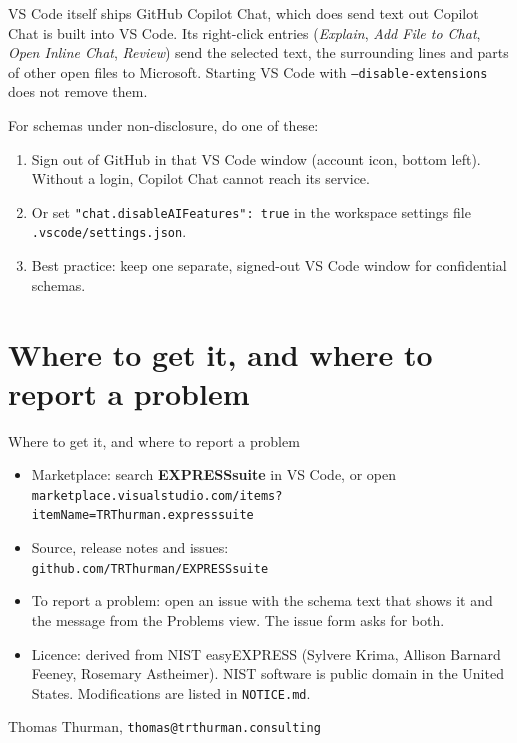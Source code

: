\documentclass[11pt]{beamer}
\newcommand{\code}[1]{\texttt{#1}}
\begin{document}
\begin{frame}{VS Code itself ships GitHub Copilot Chat, which does send text out}
  Copilot Chat is built into VS Code. Its right-click entries (\emph{Explain},
  \emph{Add File to Chat}, \emph{Open Inline Chat}, \emph{Review}) send the selected
  text, the surrounding lines and parts of other open files to Microsoft.
  Starting VS Code with \code{--disable-extensions} does not remove them.
  \medskip

  For schemas under non-disclosure, do one of these:
  \begin{enumerate}
    \item Sign out of GitHub in that VS Code window (account icon, bottom left).
      Without a login, Copilot Chat cannot reach its service.
    \item Or set \code{"chat.disableAIFeatures": true} in the workspace settings file
      \code{.vscode/settings.json}.
    \item Best practice: keep one separate, signed-out VS Code window for confidential schemas.
  \end{enumerate}
\end{frame}

\section{Where to get it, and where to report a problem}

\begin{frame}{Where to get it, and where to report a problem}
  \begin{itemize}
    \item Marketplace: search \textbf{EXPRESSsuite} in VS Code, or open\\
      \code{marketplace.visualstudio.com/items?}\\
      \code{itemName=TRThurman.expresssuite}
    \item Source, release notes and issues:\\
      \code{github.com/TRThurman/EXPRESSsuite}
    \item To report a problem: open an issue with the schema text that shows it and the
      message from the Problems view. The issue form asks for both.
    \item Licence: derived from NIST easyEXPRESS (Sylvere Krima, Allison Barnard Feeney,
      Rosemary Astheimer). NIST software is public domain in the United States.
      Modifications are listed in \code{NOTICE.md}.
  \end{itemize}
  \vfill
  \centering\footnotesize\color{sc4grey}
  Thomas Thurman, \code{thomas@trthurman.consulting}
\end{frame}
\end{document}
